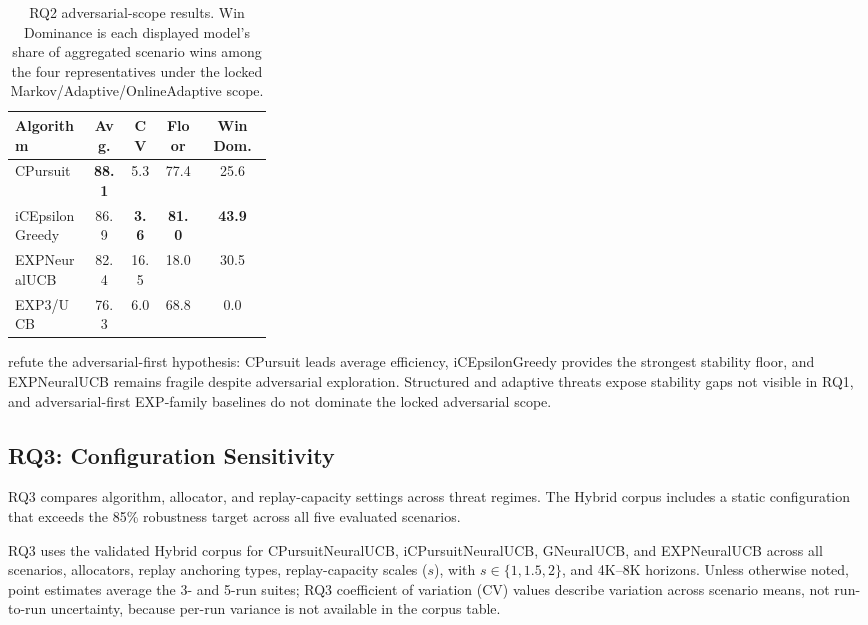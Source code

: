 \begin{table}[ht!]
\footnotesize
\centering
\setlength{\tabcolsep}{4pt}
\caption{RQ2 adversarial-scope results. Win Dominance is each displayed model's share of aggregated scenario wins among the four representatives under the locked Markov/Adaptive/OnlineAdaptive scope.}
\label{tab:rq2_adversarial}
\begin{tabular}{p{0.30\linewidth} c c c c}
\toprule
\textbf{Algorithm} & \textbf{Avg.} & \textbf{CV} & \textbf{Floor} & \textbf{Win Dom.} \\
\midrule
CPursuit & \textbf{88.1} & 5.3 & 77.4 & 25.6 \\
iCEpsilonGreedy & 86.9 & \textbf{3.6} & \textbf{81.0} & \textbf{43.9} \\
EXPNeuralUCB & 82.4 & 16.5 & 18.0 & 30.5 \\
EXP3/UCB & 76.3 & 6.0 & 68.8 & 0.0 \\
\bottomrule
\end{tabular}
\end{table}

 refute the adversarial-first hypothesis: CPursuit leads average efficiency, iCEpsilonGreedy provides the strongest stability floor, and EXPNeuralUCB remains fragile despite adversarial exploration. Structured and adaptive threats expose stability gaps not visible in RQ1, and adversarial-first EXP-family baselines do not dominate the locked adversarial scope.

\subsection{RQ3: Configuration Sensitivity}
\label{subsec:rq3}

RQ3 compares algorithm, allocator, and replay-capacity settings across threat regimes. The Hybrid corpus includes a static configuration that exceeds the 85\% robustness target across all five evaluated scenarios.

RQ3 uses the validated Hybrid corpus for CPursuitNeuralUCB, iCPursuitNeuralUCB, GNeuralUCB, and EXPNeuralUCB across all scenarios, allocators, replay anchoring types, replay-capacity scales ($s$), with $s\in\{1,1.5,2\}$, and 4K--8K horizons. Unless otherwise noted, point estimates average the 3- and 5-run suites; RQ3 coefficient of variation (CV) values describe variation across scenario means, not run-to-run uncertainty, because per-run variance is not available in the corpus table.

